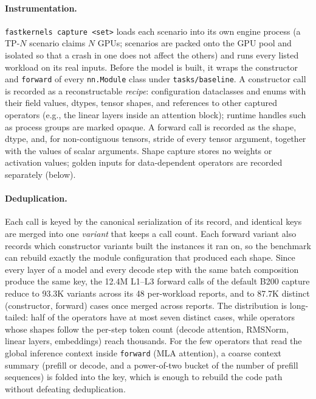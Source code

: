 \paragraph{Instrumentation.}
\texttt{fastkernels capture <set>} loads each scenario into its own engine process (a TP-$N$ scenario claims $N$ GPUs; scenarios are packed onto the GPU pool and isolated so that a crash in one does not affect the others) and runs every listed workload on its real inputs.
Before the model is built, it wraps the constructor and \texttt{forward} of every \texttt{nn.Module} class under \texttt{tasks/baseline}.
A constructor call is recorded as a reconstructable \emph{recipe}: configuration dataclasses and enums with their field values, dtypes, tensor shapes, and references to other captured operators (e.g., the linear layers inside an attention block); runtime handles such as process groups are marked opaque.
A forward call is recorded as the shape, dtype, and, for non-contiguous tensors, stride of every tensor argument, together with the values of scalar arguments.
Shape capture stores no weights or activation values; golden inputs for data-dependent operators are recorded separately (below).

\paragraph{Deduplication.}
Each call is keyed by the canonical serialization of its record, and identical keys are merged into one \emph{variant} that keeps a call count.
Each forward variant also records which constructor variants built the instances it ran on, so the benchmark can rebuild exactly the module configuration that produced each shape.
Since every layer of a model and every decode step with the same batch composition produce the same key, the 12.4M L1--L3 forward calls of the default B200 capture reduce to 93.3K variants across its 48 per-workload reports, and to 87.7K distinct (constructor, forward) cases once merged across reports.
The distribution is long-tailed: half of the operators have at most seven distinct cases, while operators whose shapes follow the per-step token count (decode attention, RMSNorm, linear layers, embeddings) reach thousands.
For the few operators that read the global inference context inside \texttt{forward} (MLA attention), a coarse context summary (prefill or decode, and a power-of-two bucket of the number of prefill sequences) is folded into the key, which is enough to rebuild the code path without defeating deduplication.

